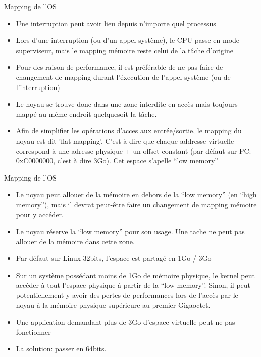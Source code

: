 \begin{frame}[fragile]{Mapping de l'OS}
  \begin{itemize} 
  \item Une interruption  peut avoir lieu depuis n'importe quel processus
  \item Lors d'une interruption (ou  d'un appel système), le CPU passe
    en mode  superviseur, mais  le mapping mémoire  reste celui  de la
    tâche d'origine
  \item Pour  des raison de performance,  il est préférable  de ne pas
    faire  de  changement de  mapping  durant  l'éxecution de  l'appel
    système (ou de l'interruption)
  \item Le noyau se trouve donc  dans une zone interdite en accès mais
    toujours mappé au même endroit quelquesoit la tâche.
  \item Afin  de simplifier les opérations  d'acces aux entrée/sortie,
    le  mapping du  noyau est  dit 'flat  mapping'. C'est  à  dire que
    chaque addresse  virtuelle correspond à une adresse  physique + un
    offset  constant (par  défaut  sur PC:  0xC0000000,  c'est à  dire
    3Go). Cet espace s'apelle ``low memory''
  \end{itemize}
\end{frame}

\begin{frame}[fragile]{Mapping de l'OS}
  \begin{itemize} 
  \item Le  noyau peut  allouer de  la mémoire en  dehors de  la ``low
    memory'' (en  ``high memory''), mais il devrat  peut-être faire un
    changement de mapping mémoire pour y accéder.
  \item Le noyau  réserve la ``low memory'' pour  son usage. Une tache
    ne peut pas allouer de la mémoire dans cette zone.
  \item Par défaut sur Linux 32bits, l'espace est partagé en 1Go / 3Go
  \item Sur un système possédant  moins de 1Go de mémoire physique, le
    kernel peut accéder à tout  l'espace physique à partir de la ``low
    memory''.  Sinon,  il peut potentiellement  y avoir des  pertes de
    performances lors  de l'accès par  le noyau à la  mémoire physique
    supérieure au premier Gigaoctet.
  \item Une application demandant  plus de 3Go d'espace virtuelle peut
    ne pas fonctionner
  \item La solution: passer en 64bits.
  \end{itemize} 
\end{frame}

